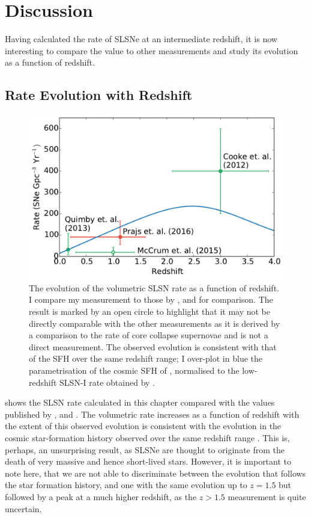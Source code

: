 \section{Discussion}
Having calculated the rate of SLSNe at an intermediate redshift, it is now interesting to compare the value to other measurements and study its evolution as a function of redshift.

\subsection{Rate Evolution with Redshift}
\label{sec:Discussion}
\begin{figure}
\includegraphics[width=\textwidth]{Figures/Chapter3/rate}
\caption{The evolution of the volumetric SLSN rate as a function of redshift. I compare my measurement to those by \citet{Cookie2012}, \citet{Quimby2014} and \citet{McCrum2014} for comparison. The \citet{McCrum2014} result is marked by an open circle to highlight that it may not be directly comparable with the other measurements as it is derived by a comparison to the rate of core collapse supernovae and is not a direct measurement. The observed evolution is consistent with that of the SFH over the same redshift range; I over-plot in blue the parametrisation of the cosmic SFH of \citet{Hopkins2006}, normalised to the low-redshift SLSN-I rate obtained by \citet{Quimby2014}.}
\label{fig:rate}
\end{figure}

 shows the SLSN rate calculated in this chapter compared with the values published by \citet{Cookie2012}, \citet{Quimby2014} and \citet{McCrum2014}. The volumetric rate increases as a function of redshift with the extent of this observed evolution is consistent with the evolution in the cosmic star-formation history observed over the same redshift range \citep{Hopkins2006}. This is, perhaps, an unsurprising result, as SLSNe are thought to originate from the death of very massive and hence short-lived stars. However, it is important to note here, that we are not able to discriminate between the evolution that follows the star formation history, and one with the same evolution up to $z=1.5$ but followed by a peak at a much higher redshift, as the $z>1.5$ measurement is quite uncertain.

